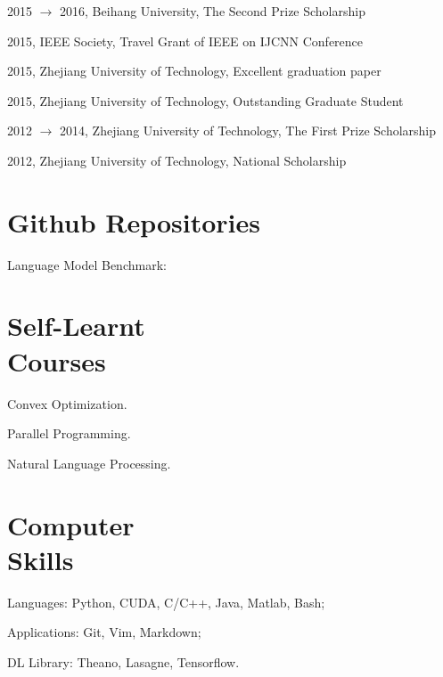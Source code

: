 \documentclass[margin,line]{resume}
\begin{document}
\begin{resume}
2015 $\to$ 2016, Beihang University, The Second Prize Scholarship

2015, IEEE Society, Travel Grant of IEEE on IJCNN Conference

2015, Zhejiang University of Technology, Excellent graduation paper

2015, Zhejiang University of Technology, Outstanding Graduate Student

2012 $\to$ 2014, Zhejiang University of Technology, The First Prize Scholarship

2012, Zhejiang University of Technology, National Scholarship

\section{Github Repositories}

Language Model Benchmark:


\section{Self-Learnt\\Courses}
Convex Optimization.

Parallel Programming.

Natural Language Processing.


\section{Computer \\ Skills}
Languages:  Python, CUDA, C/C++, Java, Matlab, Bash;

Applications: Git, Vim, Markdown;

DL Library: Theano, Lasagne, Tensorflow.\\

\end{resume}
\end{document}
